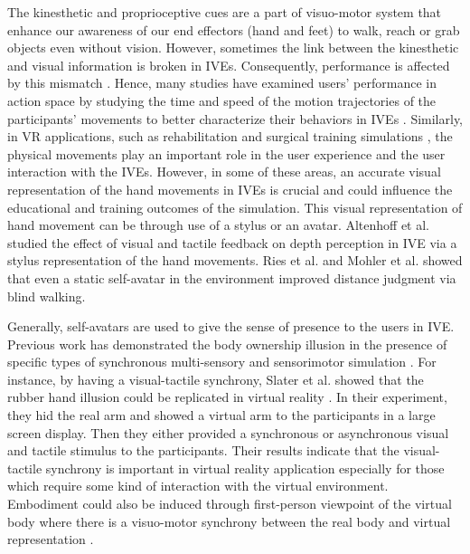 The kinesthetic and proprioceptive cues are a part of visuo-motor system that enhance our awareness of our end effectors (hand and feet) to walk, reach or grab objects even without vision. However, sometimes the link between the kinesthetic and visual information is broken in IVEs. Consequently, performance is affected by this mismatch \cite{so+15}. Hence, many studies have examined users' performance in action space by studying the time and speed of the motion trajectories of the participants' movements to better characterize their behaviors in IVEs \cite{so+15,cp+10,bm+99}. Similarly, in VR applications, such as rehabilitation \cite{DHH+13} and surgical training simulations \cite{S08}, the physical movements play an important role in the user experience and the user interaction with the IVEs. However, in some of these areas, an accurate visual representation of the hand movements in IVEs is crucial and could influence the educational and training outcomes of the simulation. This visual representation of hand movement can be through use of a stylus or an avatar. Altenhoff et al. \cite{ANL+12} studied the effect of visual and tactile feedback on depth perception in IVE via a stylus representation of the hand movements. Ries et al. \cite{RIK+08} and Mohler et al. \cite{MCW+10} showed that even a static self-avatar in the environment improved distance judgment via blind walking. 

Generally, self-avatars are used to give the sense of presence to the users in IVE. Previous work has demonstrated the body ownership illusion in the presence of specific types of synchronous multi-sensory and sensorimotor simulation \cite{SPD+09,SPD+08}. For instance, by having a visual-tactile synchrony, Slater et al. showed that the rubber hand illusion could be replicated in virtual reality \cite{SPD+08}. In their experiment, they hid the real arm and showed a virtual arm to the participants in a large screen display. Then they either provided a synchronous or asynchronous visual and tactile stimulus to the participants. Their results indicate that the visual-tactile synchrony is important in virtual reality application especially for those which require some kind of interaction with the virtual environment. Embodiment could also be induced through first-person viewpoint of the virtual body where there is a visuo-motor synchrony between the real body and virtual representation \cite{BGS13,MS13}.

